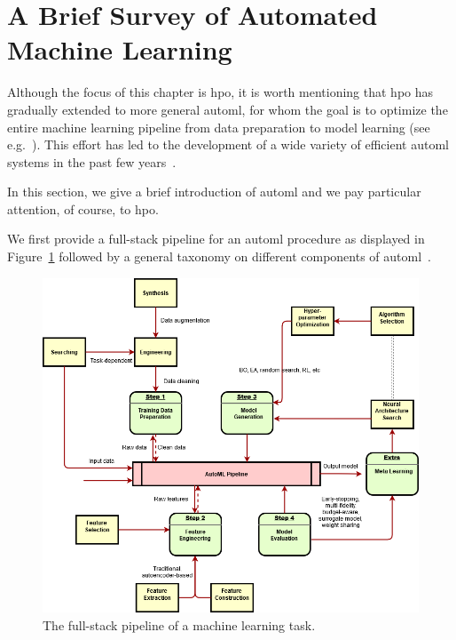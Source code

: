 \section{A Brief Survey of Automated Machine Learning}\label{sec:dttts.survey}

Although the focus of this chapter is \gls{hpo}, it is worth mentioning that \gls{hpo} has gradually extended to more general \gls{automl}, for whom the goal is to optimize the entire machine learning pipeline from data preparation to model learning (see e.g.~\citealt{feurer2015fms}). This effort has led to the development of a wide variety of efficient
\gls{automl} systems in the past few years~\citep{thornton2013autoweka,kotthoff2017autoweka,olson2019tpot,mohr2018automl,rakotoarison2019mcts}.

In this section, we give a brief introduction of \gls{automl} and we pay particular attention, of course, to \gls{hpo}. 

We first provide a full-stack pipeline for an \gls{automl} procedure as displayed in Figure~\ref{fig:automl} followed by a general taxonomy on different components of \gls{automl}~\citep{hutter2019automl,zoller2019automl,he2019automl}. 

\begin{figure}[ht]
    \centering
    \includegraphics[width=\textwidth]{Chapter6/img/automl.png}
    \caption{The full-stack pipeline of a machine learning task.}
    \label{fig:automl}
\end{figure}


